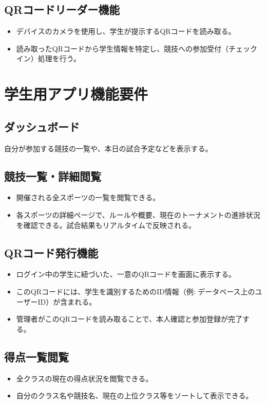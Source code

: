 \documentclass[12pt]{ltjsarticle} %
\begin{document}
\subsection{QRコードリーダー機能}
\begin{itemize}
    \item デバイスのカメラを使用し、学生が提示するQRコードを読み取る。
    \item 読み取ったQRコードから学生情報を特定し、競技への参加受付（チェックイン）処理を行う。
\end{itemize}

\section{学生用アプリ機能要件}

\subsection{ダッシュボード}
自分が参加する競技の一覧や、本日の試合予定などを表示する。

\subsection{競技一覧・詳細閲覧}
\begin{itemize}
    \item 開催される全スポーツの一覧を閲覧できる。
    \item 各スポーツの詳細ページで、ルールや概要、現在のトーナメントの進捗状況を確認できる。試合結果もリアルタイムで反映される。
\end{itemize}

\subsection{QRコード発行機能}
\begin{itemize}
    \item ログイン中の学生に紐づいた、一意のQRコードを画面に表示する。
    \item このQRコードには、学生を識別するためのID情報（例: データベース上のユーザーID）が含まれる。
    \item 管理者がこのQRコードを読み取ることで、本人確認と参加登録が完了する。
\end{itemize}

\subsection{得点一覧閲覧}
\begin{itemize}
    \item 全クラスの現在の得点状況を閲覧できる。
    \item 自分のクラス名や競技名、現在の上位クラス等をソートして表示できる。
\end{itemize}
\end{document}
